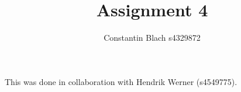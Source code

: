 \documentclass[12pt]{article}
\title {Assignment 4}
\author {Constantin Blach s4329872}
\begin{document}
\maketitle

This was done in collaboration with Hendrik Werner (s4549775).

\section{} %
\section{} %
\section{} %
\section{} %
\section{} %
\section{} %
\end{document}
